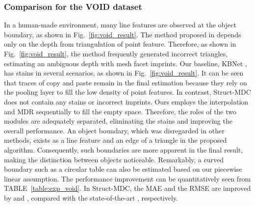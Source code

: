 \subsubsection{Comparison for the VOID dataset}
In \textcolor{color1}{a} human-made environment, many line features are observed at the object boundary\textcolor{color1}{,} as shown in Fig.~\ref{fig:void_result}.
The method proposed in \cite{void} depends only on \textcolor{color1}{the} depth from triangulation of point \textcolor{color1}{feature}. Therefore, as shown in Fig.~\ref{fig:void_result}, the method \textcolor{color1}{frequently} generated incorrect triangles, estimating an ambiguous depth with mesh facet imprints. 
Our baseline, KBNet \cite{baseline}, has stains in several \textcolor{color1}{scenarios}, as shown in Fig.~\ref{fig:void_result}. It can be \textcolor{color1}{seen} that traces of copy and paste remain in the final estimation \textcolor{color1}{because} they rely on the pooling layer to fill the low density of point features. 
In contrast, Struct-MDC does not contain any stains or incorrect imprints.
Ours employs the interpolation and MDR sequentially to fill the empty space. 
Therefore, the role\textcolor{color1}{s} of \textcolor{color1}{the two} module\textcolor{color1}{s are} adequately \textcolor{color1}{separated}, eliminating the stains and improving \textcolor{color1}{the} overall performance. 
An object boundary, which was disregarded in other methods, exists as \textcolor{color1}{a} line \textcolor{color1}{feature} and an edge of a triangle in the proposed algorithm. 
Consequently, \textcolor{color1}{such} boundaries \textcolor{color1}{are} more apparent in the final result, making the distinction between objects \textcolor{color1}{noticeable}. Remarkably, a curved boundary such as a circular table can also be estimated \textcolor{color1}{based on} our \textcolor{color1}{piecewise} linear assumption.  
The performance improvement \textcolor{color1}{can be} quantitatively \textcolor{color1}{seen from} TABLE~\ref{table:exp_void}. In Struct-MDC, the MAE and the RMSE are improved by  and , compared \textcolor{color1}{with} the state-of-the-art \cite{baseline}, respectively.



